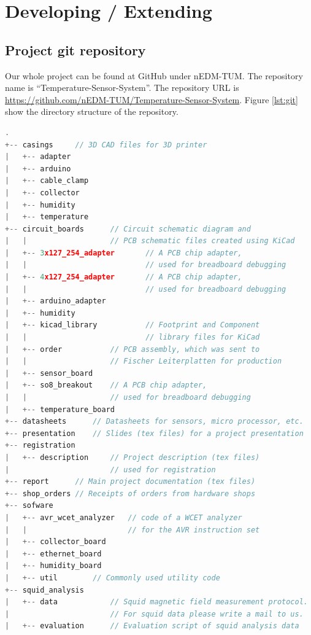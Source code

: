 \documentclass[a4paper]{scrreprt}
\begin{document}
\section{Developing / Extending}
\subsection{Project git repository}
Our whole project can be found at GitHub under nEDM-TUM. The repository name is ``Temperature-Sensor-System''. The repository URL is \url{https://github.com/nEDM-TUM/Temperature-Sensor-System}. Figure \ref{lst:git} show the directory structure of the repository.
\lstset{style=mathstyle}
\begin{lstlisting}[language=c,xleftmargin=25pt, xrightmargin=25pt,framexleftmargin=10pt,framextopmargin=10pt, framexbottommargin=10pt, caption={Directory structure in the project git repository}, label={lst:git}]
.
+-- casings     // 3D CAD files for 3D printer
|   +-- adapter
|   +-- arduino
|   +-- cable_clamp
|   +-- collector
|   +-- humidity
|   +-- temperature
+-- circuit_boards      // Circuit schematic diagram and 
|   |                   // PCB schematic files created using KiCad
|   +-- 3x127_254_adapter       // A PCB chip adapter, 
|   |                           // used for breadboard debugging
|   +-- 4x127_254_adapter       // A PCB chip adapter, 
|   |                           // used for breadboard debugging
|   +-- arduino_adapter
|   +-- humidity
|   +-- kicad_library           // Footprint and Component
|   |                           // library files for KiCad
|   +-- order           // PCB assembly, which was sent to 
|   |                   // Fischer Leiterplatten for production
|   +-- sensor_board
|   +-- so8_breakout    // A PCB chip adapter, 
|   |                   // used for breadboard debugging
|   +-- temperature_board
+-- datasheets      // Datasheets for sensors, micro processor, etc.
+-- presentation    // Slides (tex files) for a project presentation
+-- registration    
|   +-- description     // Project description (tex files) 
|                       // used for registration
+-- report      // Main project documentation (tex files)
+-- shop_orders // Receipts of orders from hardware shops
+-- sofware
|   +-- avr_wcet_analyzer   // code of a WCET analyzer
|   |                       // for the AVR instruction set
|   +-- collector_board      
|   +-- ethernet_board        
|   +-- humidity_board      
|   +-- util        // Commonly used utility code
+-- squid_analysis      
|   +-- data            // Squid magnetic field measurement protocol.
|                       // For squid data please write a mail to us.
|   +-- evaluation      // Evaluation script of squid analysis data
\end{lstlisting}
\end{document}
